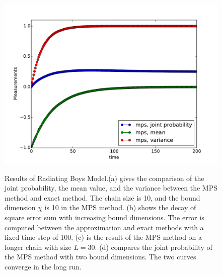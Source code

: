 \documentclass[english]{article}[12pt]
\begin{document}
\begin{figure}[H]
{\includegraphics[scale=0.4]{Result_Fig/Radiating_MPS_t200_s100_bd10.pdf}}\hfill
{}
  \caption{Results of Radiating Boys Model.(a) gives the comparison of the joint probability, the mean value, and the variance between the MPS method and exact method. The chain size is 10, and the bound dimension $\chi$ is 10 in the MPS method. (b) shows the decay of square error sum with increasing bound dimensions. The error is computed between the approximation and exact methods with a fixed time step of 100. (c) is the result of the MPS method on a longer chain with size $L=30$. (d) compares the joint probability of the MPS method with two bound dimensions. The two curves converge in the long run.}
  \label{fig:Radiating_result}
\end{figure}
\end{document}
